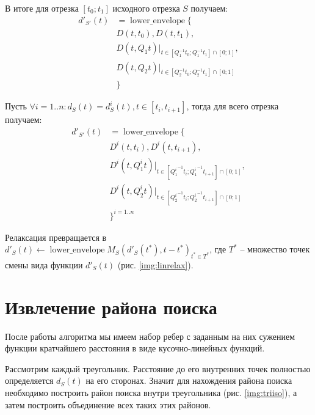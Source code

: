 В итоге для отрезка $[t_0; t_1]$ исходного отрезка $S$ получаем:
\begin{equation}
\begin{aligned}
d'_{S'}(t) &= \mathop{lower\_envelope}\{\\
&D(t, t_0), D(t, t_1),\\
&D(t, Q_1t)|_{t \in [Q_1^{-1}t_0; Q_1^{-1}t_1] \cap [0; 1]},\\
&D(t, Q_2t)|_{t \in [Q_2^{-1}t_0; Q_2^{-1}t_1] \cap [0; 1]}\\
&\}
\end{aligned}
\end{equation}

Пусть $\forall i = 1..n: d_S(t) = d^i_S(t), t \in [t_i, t_{i+1}]$,
тогда для всего отрезка получаем:
\begin{equation}
\begin{aligned}
d'_{S'}(t) &= \mathop{lower\_envelope}\{\\
&D^i(t, t_i), D^i(t, t_{i+1}),\\
&D^i(t, Q^i_1t)|_{t \in [{Q^i_1}^{-1}t_i; {Q^i_1}^{-1}t_{i+1}] \cap [0; 1]},\\
&D^i(t, Q^i_2t)|_{t \in [{Q^i_2}^{-1}t_i; {Q^i_2}^{-1}t_{i+1}] \cap [0; 1]}\\
&\}^{i=1..n}
\end{aligned}
\end{equation}

Релаксация превращается в
$d'_S(t) \gets \mathop{lower\_envelope}{M_S(d'_S(t^*), t - t^*)}_{t^* \in T^*}$,
где $T^*$ -- множество точек смены вида функции $d'_S(t)$ (рис. \ref{img:linrelax}).


\FloatBarrier

\section{Извлечение района поиска}
После работы алгоритма мы имеем набор ребер с заданным
на них сужением функции кратчайшего расстояния в виде кусочно-линейных
функций.

Рассмотрим каждый треугольник. Расстояние до его внутренних точек
полностью определяется $d_S(t)$ на его сторонах. Значит для нахождения
района поиска необходимо построить район поиска внутри треугольника (рис. \ref{img:triiso}),
а затем построить объединение всех таких этих районов.


